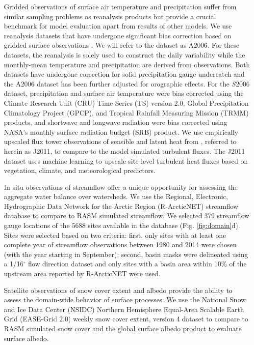 Gridded observations of surface air temperature and precipitation suffer from similar sampling problems as reanalysis products but provide a crucial benchmark for model evaluation apart from results of other models.
We use reanalysis datasets that have undergone significant bias correction based on gridded surface observations \citep{Adam_2006,Sheffield_2006}.
We will refer to the \citet{Adam_2006} dataset as A2006.
For these datasets, the reanalysis is solely used to construct the daily variability while the monthly-mean temperature and precipitation are derived from observations.
Both datasets have undergone correction for solid precipitation gauge undercatch and the A2006 dataset has been further adjusted for orographic effects.
For the $S2006$ dataset, precipitation and surface air temperature were bias corrected using the Climate Research Unit (CRU) Time Series (TS) version 2.0, Global Precipitation Climatology Project (GPCP), and Tropical Rainfall Measuring Mission (TRMM) products, and shortwave and longwave radiation were bias corrected using NASA’s monthly surface radiation budget (SRB) product.
We use empirically upscaled flux tower observations of sensible and latent heat from \citet{Jung_2011}, referred to herein as J2011, to compare to the model simulated turbulent fluxes.
The J2011 dataset uses machine learning to upscale site-level turbulent heat fluxes based on vegetation, climate, and meteorological predictors.

In situ observations of streamflow offer a unique opportunity for assessing the aggregate water balance over watersheds.
We use the Regional, Electronic, Hydrographic Data Network for the Arctic Region (R-ArcticNET) streamflow database \citep{Lammers_2001} to compare to RASM simulated streamflow.
We selected 379 streamflow gauge locations of the 5688 sites available in the database (Fig. \ref{fig:domain}d).
Sites were selected based on two criteria: first, only sites with at least one complete year of streamflow observations between 1980 and 2014 were chosen (with the year starting in September); second, basin masks were delineated using a 1/16$^{\circ}$ flow direction dataset \citep{Wu_2011} and only sites with a basin area within 10\% of the upstream area reported by R-ArcticNET were used.

Satellite observations of snow cover extent and albedo provide the ability to assess the domain-wide behavior of surface processes.
We use the National Snow and Ice Data Center (NSIDC) Northern Hemisphere Equal-Area Scalable Earth Grid (EASE-Grid 2.0) weekly snow cover extent, version 4 dataset \citep{Brodzik_2013} to compare to RASM simulated snow cover and the global surface albedo product \citep[GlobAlbedo; ][]{Muller_2012} to evaluate surface albedo.

